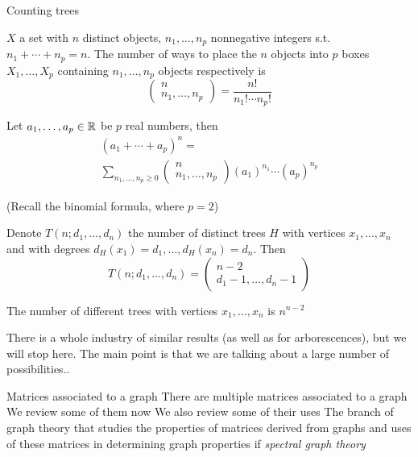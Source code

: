 \documentclass[aspectratio=43]{beamer}
\begin{document}
\begin{frame}{Counting trees}
\begin{proposition}
$X$ a set with $n$ distinct objects, $n_1,\ldots,n_p$ nonnegative integers s.t. $n_1+\cdots+n_p=n$. The number of ways to place the $n$ objects into $p$ boxes $X_1,\ldots,X_p$ containing $n_1,\ldots,n_p$ objects respectively is 
\[
	\begin{pmatrix}
		n\\ n_1,\ldots,n_p
	\end{pmatrix}
	=
	\frac{n!}{n_1!\cdots n_p!}
\]
\end{proposition}
\vfill
\begin{proposition}
Let $a_1,\ldots,a_p\in\mathbb{R}$ be $p$ real numbers, then
\begin{multline*}
	(a_1+\cdots+a_p)^n= \\
	\sum_{n_1,\ldots,n_p\geq 0}
	\begin{pmatrix}
		n\\ n_1,\ldots,n_p
	\end{pmatrix}
	(a_1)^{n_1}\cdots(a_p)^{n_p}	
\end{multline*}
\end{proposition}
(Recall the binomial formula, where $p=2$)
\end{frame}


\begin{frame}
\begin{theorem}
Denote $T(n;d_1,\ldots,d_n)$ the number of distinct trees $H$ with vertices $x_1,\ldots,x_n$ and with degrees $d_H(x_1)=d_1,\ldots,d_H(x_n)=d_n$. Then
\[
	T(n;d_1,\ldots,d_n) = 
	\begin{pmatrix}
		n-2 \\
		d_1-1,\ldots,d_n-1
	\end{pmatrix}
\]
\end{theorem}
\vfill
\begin{theorem}
The number of different trees with vertices $x_1,\ldots,x_n$ is 
$n^{n-2}$
\end{theorem}
\vfill
There is a whole industry of similar results (as well as for arborescences), but we will stop here. The main point is that we are talking about a large number of possibilities..
\end{frame}


\begin{frame}{Matrices associated to a graph}
	There are multiple matrices associated to a graph
	\vfill
	We review some of them now
	\vfill
	We also review some of their uses
	\vfill
	The branch of graph theory that studies the properties of matrices derived from graphs and uses of these matrices in determining graph properties if \emph{spectral graph theory}
\end{frame}
\end{document}
